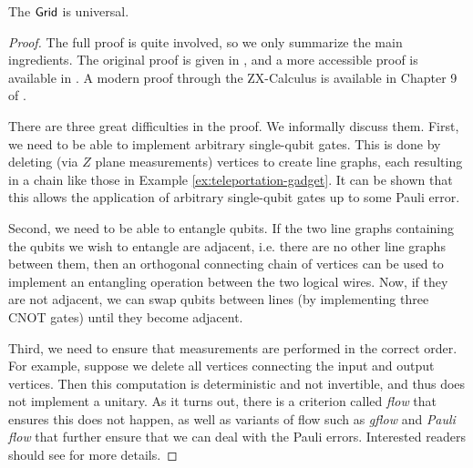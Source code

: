 \begin{theorem}
\label{thm:grid-universal}
The $\mathsf{Grid}$ is universal.
\end{theorem}



\begin{proof}
The full proof is quite involved, so we only summarize the main ingredients. The original proof is given in \cite{MBQCOriginal}, and a more accessible proof is available in \cite{Raussendorf_2003}. A modern proof through the ZX-Calculus is available in Chapter 9 of \cite{PQS}. 

There are three great difficulties in the proof. We informally discuss them. First, we need to be able to implement arbitrary single-qubit gates. This is done by deleting (via $Z$ plane measurements) vertices to create line graphs, each resulting in a chain like those in Example \ref{ex:teleportation-gadget}. It can be shown that this allows the application of arbitrary single-qubit gates up to some Pauli error.

Second, we need to be able to entangle qubits. If the two line graphs containing the qubits we wish to entangle are adjacent, i.e. there are no other line graphs between them, then an orthogonal connecting chain of vertices can be used to implement an
entangling operation between the two logical wires. Now, if they are not adjacent, we can swap qubits between lines (by implementing three CNOT gates) until they become adjacent.

Third, we need to ensure that measurements are performed in the correct order. For example, suppose we delete all vertices connecting the input and output vertices. Then this computation is deterministic and not invertible, and thus does not implement a unitary. As it turns out, there is a criterion called \emph{flow} that ensures this does not happen, as well as variants of flow such as \emph{gflow} and \emph{Pauli flow} that further ensure that we can deal with the Pauli errors. Interested readers should see \cite{McElvanney_2023,Backens_2021,PQS} for more details.
\end{proof}

